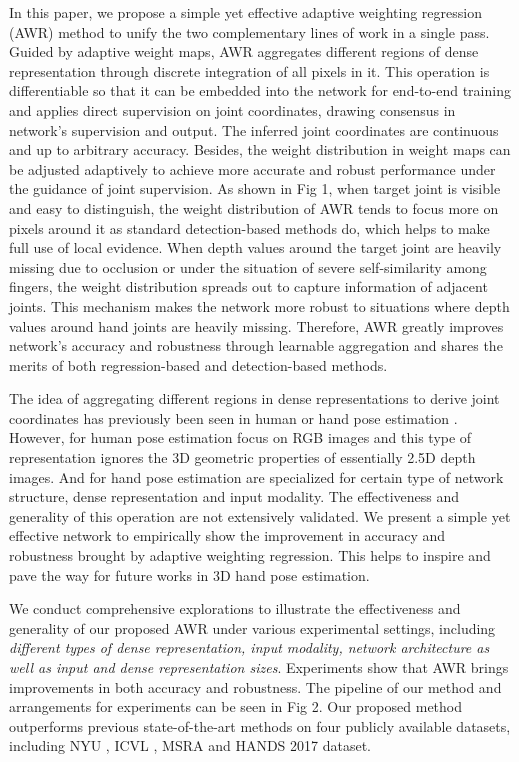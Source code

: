 \documentclass[letterpaper]{article} \usepackage{aaai20}  \usepackage{times}  \usepackage{helvet} \usepackage{courier}  \usepackage[hyphens]{url}  \usepackage{graphicx} \usepackage{amsmath}
\begin{document}
In this paper, we propose a simple yet effective adaptive weighting regression (AWR) method to unify the two complementary lines of work in a single pass. Guided by adaptive weight maps, AWR aggregates different regions of dense representation through discrete integration of all pixels in it. This operation is differentiable so that it can be embedded into the network for end-to-end training and applies direct supervision on joint coordinates, drawing consensus in network's supervision and output. The inferred joint coordinates are continuous and up to arbitrary accuracy. Besides, the weight distribution in weight maps can be adjusted adaptively to achieve more accurate and robust performance under the guidance of joint supervision. As shown in Fig 1, when target joint is visible and easy to distinguish, the weight distribution of AWR tends to focus more on pixels around it as standard detection-based methods do, which helps to make full use of local evidence. When depth values around the target joint are heavily missing due to occlusion or under the situation of severe self-similarity among fingers, the weight distribution spreads out to capture information of adjacent joints. This mechanism makes the network more robust to situations where depth values around hand joints are heavily missing. Therefore, AWR greatly improves network's accuracy and robustness through learnable aggregation and shares the merits of both regression-based and detection-based methods. 

\parskip=0pt

The idea of aggregating different regions in dense representations to derive joint coordinates has previously been seen in human \cite{integral} or hand pose estimation \cite{a2j,pixelwise}. However, \cite{integral} for human pose estimation focus on RGB images and this type of representation ignores the 3D geometric properties of essentially 2.5D depth images. And \cite{a2j,pixelwise} for hand pose estimation are specialized for certain type of network structure, dense representation and input modality. The effectiveness and generality of this operation are not extensively validated. We present a simple yet effective network to empirically show the improvement in accuracy and robustness brought by adaptive weighting regression. This helps to inspire and pave the way for future works in 3D hand pose estimation.

\parskip=0pt

We conduct comprehensive explorations to illustrate the effectiveness and generality of our proposed AWR under various experimental settings, including \textit{different types of dense representation, input modality, network architecture as well as input and dense representation sizes}. Experiments show that AWR brings improvements in both accuracy and robustness. The pipeline of our method and arrangements for experiments can be seen in Fig 2. Our proposed method outperforms previous state-of-the-art methods on four publicly available datasets, including NYU \cite{nyu}, ICVL \cite{icvl}, MSRA \cite{offset2} and HANDS 2017 \cite{hands17} dataset. 
\end{document}
